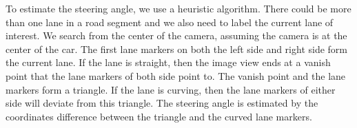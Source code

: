 {To estimate the steering angle, we use a heuristic algorithm. 
There could be more than one lane in a road segment
and we also need to label the current lane of interest. 
We search from the center of the camera, assuming 
the camera is at the center of the car. 
The first lane markers on both the left side and right side
form the current lane. 
If the lane is straight, then the image view ends at a vanish point
that the lane markers of both side point to. 
The vanish point and the lane markers form a triangle. 
If the lane is curving, then the lane markers of either side
will deviate from this triangle. 
The steering angle is estimated by the coordinates difference
between the triangle and the curved lane markers.   

 }




